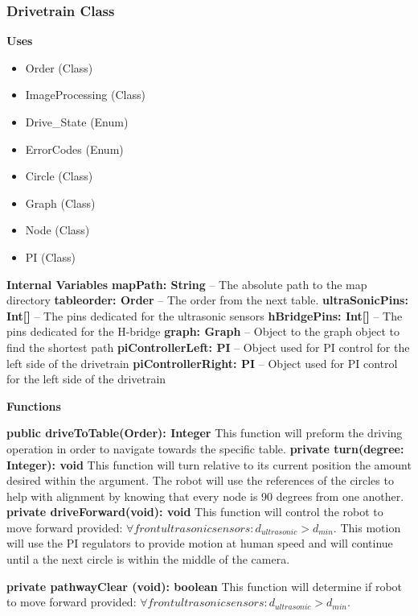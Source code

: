\documentclass [10pt]{article}
\begin{document}
\subsubsection{Drivetrain Class}
\textbf{Uses}
\begin{itemize}
	\item Order (Class)
	\item ImageProcessing (Class)
	\item Drive\_State (Enum)
	\item ErrorCodes (Enum)
	\item Circle (Class)
	\item Graph (Class)
	\item Node (Class)
	\item PI (Class)
\end{itemize}


\textbf{Internal Variables}
\textbf{mapPath: String} – The absolute path to the map directory
\textbf{tableorder: Order} – The order from the next table.
\textbf{ultraSonicPins: Int[]} – The pins dedicated for the ultrasonic sensors
\textbf{hBridgePins: Int[]} – The pins dedicated for the H-bridge
\textbf{graph: Graph} – Object to the graph object to find the shortest path
\textbf{piControllerLeft: PI} – Object used for PI control for the left side of the drivetrain
\textbf{piControllerRight: PI} – Object used for PI control for the left side of the drivetrain

\textbf{Functions}

\textbf{public driveToTable(Order): Integer}
This function will preform the driving operation in order to navigate towards the specific table.
\textbf{private turn(degree: Integer): void}
This function will turn relative to its current position the amount desired within the argument. The robot will use the references of the circles to help with alignment by knowing that every node is 90 degrees from one another.
\textbf{private driveForward(void): void}
This function will control the robot to move forward provided: $ \forall front ultrasonic sensors: d_{ultrasonic} > d_{min} $. This motion will use the PI regulators to provide motion at human speed and will continue until a the next circle is within the middle of the camera.

\textbf{private pathwayClear (void): boolean}
This function will determine if robot to move forward provided: $ \forall front ultrasonic sensors: d_{ultrasonic} > d_{min} $. 
\end{document}
